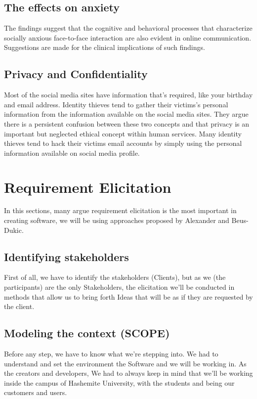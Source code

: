 \documentclass[12pt]{article}
\begin{document}
\subsection{The effects on anxiety}
The findings suggest that the cognitive and behavioral processes that characterize socially anxious face-to-face interaction are also evident in online communication. Suggestions are made for the clinical implications of such findings.\cite{firstone}
\subsection{Privacy and Confidentiality}
Most of the social media sites have information that's required, like your birthday and email address. Identity thieves tend to gather their victims’s personal information from the information available on the social media sites. They argue there is a persistent confusion between these two concepts and that privacy is an important but neglected ethical concept within human services. Many identity thieves tend to hack their victims email accounts by simply using the personal information available on social media profile.\cite{Confidentiality}


\section{Requirement Elicitation}
In this sections, many argue requirement elicitation is the most important in creating software, we will be using approaches proposed by Alexander and Beus-Dukic.

\subsection{Identifying stakeholders} 
First of all, we have to identify the stakeholders (Clients), but as we (the participants) are the only Stakeholders, the elicitation we'll be conducted in methods that allow us to bring forth Ideas that will be as if they are requested by the client.
\subsection{Modeling the context (SCOPE)}
Before any step, we have to know what we're stepping into.
We had to understand and set the environment the Software and we will be working in. As the creators and developers, 
We had to always keep in mind that we'll be working inside the campus of Hashemite University, with the students and being our customers and users.
\end{document}
